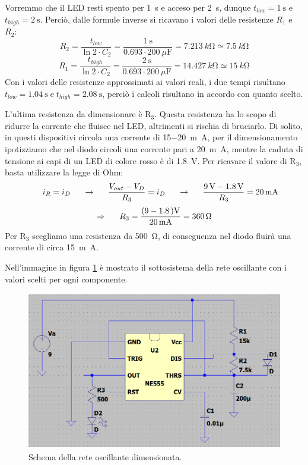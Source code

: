 \documentclass{report}
\begin{document}
Vorremmo che il LED resti spento per \SI{1}{\second} e acceso per \SI{2}{\second}, dunque $\displaystyle{t_{low}=\SI{1}{\second}}$ e $\displaystyle{t_{high}=\SI{2}{\second}}$. Perciò, dalle formule inverse si ricavano i valori delle resistenze $R_1$ e $R_2$:
\\$$R_2 = \frac{t_{low}}{\ln2\cdot C_2}=\frac{\SI{1}{\second}}{0.693\cdot\SI{200}{\mu\farad}}=\SI{7.213}{k\ohm}\simeq\SI{7.5}{k\ohm}$$
$$R_1 = \frac{t_{high}}{\ln2\cdot C_2}=\frac{\SI{2}{\second}}{0.693\cdot\SI{200}{\mu\farad}}=\SI{14.427}{k\ohm}\simeq\SI{15}{k\ohm}$$
Con i valori delle resistenze approssimati ai valori reali, i due tempi risultano $\displaystyle{t_{low}=\SI{1.04}{\second}\mathrm{\;e\;}t_{high}=\SI{2.08}{\second}}$, perciò i calcoli risultano in accordo con quanto scelto. \par
L'ultima resistenza da dimensionare è $\mathrm{R_3}$. Questa resistenza ha lo scopo di ridurre la corrente che fluisce nel LED, altrimenti si rischia di bruciarlo. Di solito, in questi dispositivi circola una corrente di 15\SI{-20}{m\ampere}, per il dimensionamento ipotizziamo che nel diodo circoli una corrente pari a \SI{20}{m\ampere}, mentre la caduta di tensione ai capi di un LED di colore rosso è di \SI{1.8}{\volt}. Per ricavare il valore di $\mathrm{R_3}$, basta utilizzare la legge di Ohm:
$$\indent i_R = i_D\indent\rightarrow\indent \frac{V_{out}-V_D}{R_3}=i_D\indent\rightarrow\indent\frac{\SI{9}{\volt}-\SI{1.8}{\volt}}{R_3}=\SI{20}{m\ampere}$$
$$\Rightarrow\indent R_3=\frac{(9\SI{-1.8}{)\volt}}{\SI{20}{m\ampere}}=\SI{360}{\ohm}$$
Per $\mathrm{R_3}$ scegliamo una resistenza da \SI{500}{\ohm}, di conseguenza nel diodo fluirà una corrente di circa \SI{15}{m\ampere}. \par 
Nell'immagine in figura \ref{figura:dim555} è mostrato il sottosistema della rete oscillante con i valori scelti per ogni componente. 
\begin{figure}[h!]
	\centering
	\includegraphics[height=6.9cm]{immagini/dim555}
	\caption{Schema della rete oscillante dimensionata.} 
	\label{figura:dim555}
\end{figure}
\end{document}
